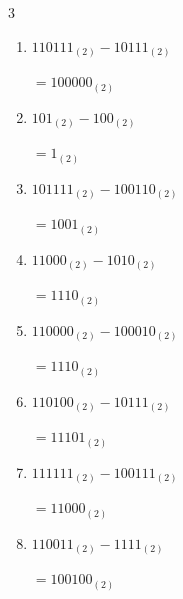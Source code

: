 \begin{multicols}{3}
\begin{enumerate}
  \item $110111_{(2)} - 10111_{(2)}$

        $=100000_{(2)}$

  \item $101_{(2)} - 100_{(2)}$

        $=1_{(2)}$

  \item $101111_{(2)} - 100110_{(2)}$

        $=1001_{(2)}$

  \item $11000_{(2)} - 1010_{(2)}$

        $=1110_{(2)}$

  \item $110000_{(2)} - 100010_{(2)}$

        $=1110_{(2)}$

  \item $110100_{(2)} - 10111_{(2)}$

        $=11101_{(2)}$

  \item $111111_{(2)} - 100111_{(2)}$

        $=11000_{(2)}$

  \item $110011_{(2)} - 1111_{(2)}$

        $=100100_{(2)}$

\end{enumerate}
\end{multicols}
